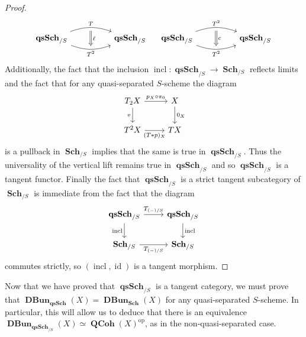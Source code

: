 \documentclass{amsart}
\theoremstyle{definition}
\DeclareMathOperator{\qsSch}{\mathbf{qsSch}}
\DeclareMathOperator{\id}{id}
\DeclareMathOperator{\op}{op}
\DeclareMathOperator{\Sch}{\mathbf{Sch}}
\DeclareMathOperator{\QCoh}{\mathbf{QCoh}}
\DeclareMathOperator{\DBun}{\mathbf{DBun}}
\numberwithin{equation}{subsection}
\begin{document}
\begin{proof}
\[\begin{tikzcd}
	\qsSch_{/S} \ar[rr, bend left = 20, ""{name = U}]{}{T} \ar[rr, bend right = 20, swap, ""{name = D}]{}{T^2} & & \qsSch_{/S}
	\ar[from = U, to = D, Rightarrow, shorten <= 4pt, shorten >= 4pt]{}{\ell}
\end{tikzcd}\quad
\begin{tikzcd}
	\qsSch_{/S} \ar[rr, bend left = 20, ""{name = U}]{}{T^2} \ar[rr, bend right = 20, swap, ""{name = D}]{}{T^2} & & \qsSch_{/S}
	\ar[from = U, to = D, Rightarrow, shorten <= 4pt, shorten >= 4pt]{}{c}
\end{tikzcd}
\]
Additionally, the fact that the inclusion $\operatorname{incl}:\qsSch_{/S} \to \Sch_{/S}$ reflects limits and the fact that for any quasi-separated $S$-scheme the diagram
\[
\begin{tikzcd}
T_2X \ar[r]{}{p_X \circ \pi_0} \ar[d, swap]{}{v} & X \ar[d]{}{0_X} \\
T^2X \ar[r, swap]{}{(T \ast p)_X} & TX
\end{tikzcd}
\]
is a pullback in $\Sch_{/S}$ implies that the same is true in $\qsSch_{/S}$. Thus the universality of the vertical lift remains true in $\qsSch_{/S}$ and so $\qsSch_{/S}$ is a tangent functor. Finally the fact that $\qsSch_{/S}$ is a strict tangent subcategory of $\Sch_{/S}$ is immediate from the fact that the diagram
\[
\begin{tikzcd}
	\qsSch_{/S} \ar[r]{}{T_{(-)/S}} \ar[d, swap]{}{\operatorname{incl}} & \qsSch_{/S} \ar[d]{}{\operatorname{incl}} \\
	\Sch_{/S} \ar[r, swap]{}{T_{(-)/S}} & \Sch_{/S}
\end{tikzcd}
\]
commutes strictly, so $(\operatorname{incl},\id)$ is a tangent morphism.
\end{proof}

Now that we have proved that $\qsSch_{/S}$ is a tangent category, we must prove that $\DBun_{\qsSch}(X) = \DBun_{\Sch}(X)$ for any quasi-separated $S$-scheme. In particular, this will allow us to deduce that there is an equivalence $\DBun_{\qsSch_{/S}}(X) \simeq \QCoh(X)^{\op}$, as in the non-quasi-separated case.
\end{document}
